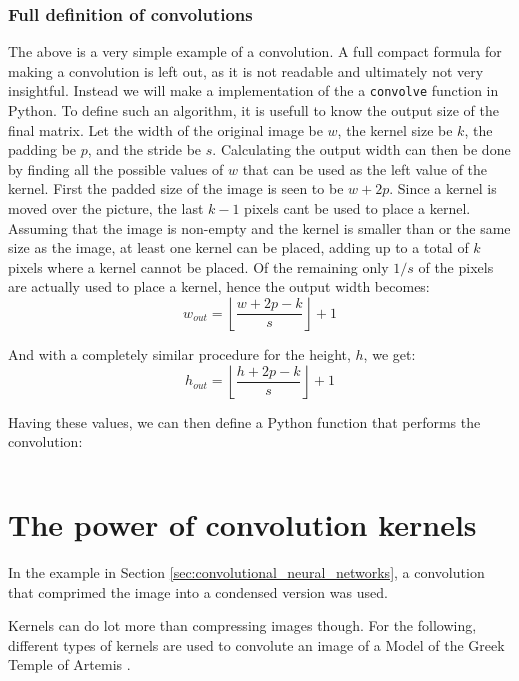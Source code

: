 \subsubsection{Full definition of convolutions}\label{sec:convolution_definition}
The above is a very simple example of a convolution.
A full compact formula for making a convolution is left out, as it is not readable and
ultimately not very insightful. 
Instead we will make a implementation of the a \verb|convolve| function in Python.
To define such an algorithm, it is usefull to know the output size of the final matrix.
Let the width of the original image be $w$, the kernel size be $k$, the padding be $p$, and the stride be $s$.
Calculating the output width can then be done by finding all the possible values of $w$ that can be
used as the left value of the kernel.
First the padded size of the image is seen to be $w + 2p$.
Since a kernel is moved over the picture, the last $k-1$ pixels cant be used to place a kernel.
Assuming that the image is non-empty and the kernel is smaller than or the same size as the image,
at least one kernel can be placed, adding up to a total of $k$ pixels where a kernel cannot be placed.
Of the remaining only $1/s$ of the pixels are actually used to place a kernel, hence the output width becomes:
\begin{equation}
    w_{out} = \left\lfloor \frac{w + 2p - k}{s}\right\rfloor + 1
\end{equation}

And with a completely similar procedure for the height, $h$, we get:
\begin{equation}
    h_{out} = \left\lfloor \frac{h + 2p - k}{s} \right\rfloor + 1
\end{equation}

Having these values, we can then define a Python function that performs the convolution:

\inputminted[]{python}{src/convolve.py}

\section{The power of convolution kernels}
In the example in Section \ref{sec:convolutional_neural_networks}, a convolution that
comprimed the image into a condensed version was used.

Kernels can do lot more than compressing images though.
For the following, different types of kernels are used to convolute an image of a Model of the Greek Temple of Artemis \cite{greek-temple-picture}.

